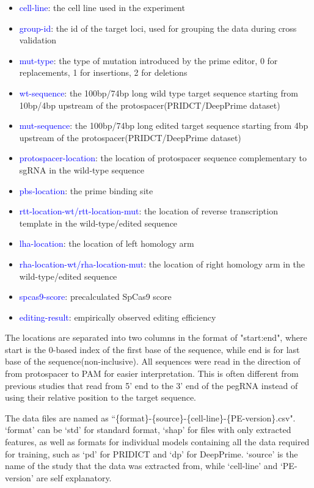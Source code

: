 \begin{itemize}[itemsep=-0mm]
    \item \textcolor{blue}{cell-line}: the cell line used in the experiment
    \item \textcolor{blue}{group-id}: the id of the target loci, used for grouping the data during cross validation
    \item \textcolor{blue}{mut-type}: the type of mutation introduced by the prime editor, 0 for replacements, 1 for insertions, 2 for deletions
    \item \textcolor{blue}{wt-sequence}: the 100bp/74bp long wild type target sequence starting from 10bp/4bp upstream of the protospacer(PRIDCT/DeepPrime dataset)
    \item \textcolor{blue}{mut-sequence}: the 100bp/74bp long edited target sequence starting from 4bp upstream of the protospacer(PRIDCT/DeepPrime dataset)
    \item \textcolor{blue}{protospacer-location}: the location of protospacer sequence complementary to sgRNA in the wild-type sequence 
    \item \textcolor{blue}{pbs-location}: the prime binding site
    \item \textcolor{blue}{rtt-location-wt/rtt-location-mut}: the location of reverse transcription template in the wild-type/edited sequence
    \item \textcolor{blue}{lha-location}: the location of left homology arm
    \item \textcolor{blue}{rha-location-wt/rha-location-mut}: the location of right homology arm in the wild-type/edited sequence
    \item \textcolor{blue}{spcas9-score}: precalculated SpCas9 score
    \item \textcolor{blue}{editing-result}: empirically observed editing efficiency
\end{itemize}

The locations are separated into two columns in the format of "start:end", where start is the 0-based index of the first base of the sequence, while end is for last base of the sequence(non-inclusive). All sequences were read in the direction of from protospacer to PAM for easier interpretation. This is often different from previous studies that read from 5' end to the 3' end of the pegRNA instead of using their relative position to the target sequence.

The data files are named as ``\{format\}-\{source\}-\{cell-line\}-\{PE-version\}.csv". `format' can be `std' for standard format, `shap' for files with only extracted features, as well as formats for individual models containing all the data required for training, such as `pd' for PRIDICT and `dp' for DeepPrime. `source' is the name of the study that the data was extracted from, while `cell-line' and `PE-version' are self explanatory.

